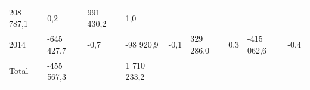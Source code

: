 \begin{longtable}[]{@{}lllllllll@{}}
\begin{minipage}[t]{0.12\columnwidth}
208 787,1\strut
\end{minipage} & \begin{minipage}[t]{0.06\columnwidth}\raggedright
0,2\strut
\end{minipage} & \begin{minipage}[t]{0.10\columnwidth}\raggedright
991 430,2\strut
\end{minipage} & \begin{minipage}[t]{0.06\columnwidth}\raggedright
1,0\strut
\end{minipage}\tabularnewline
\begin{minipage}[t]{0.05\columnwidth}\raggedright
2014\strut
\end{minipage} & \begin{minipage}[t]{0.10\columnwidth}\raggedright
-645 427,7\strut
\end{minipage} & \begin{minipage}[t]{0.06\columnwidth}\raggedright
-0,7\strut
\end{minipage} & \begin{minipage}[t]{0.16\columnwidth}\raggedright
-98 920,9\strut
\end{minipage} & \begin{minipage}[t]{0.06\columnwidth}\raggedright
-0,1\strut
\end{minipage} & \begin{minipage}[t]{0.12\columnwidth}\raggedright
329 286,0\strut
\end{minipage} & \begin{minipage}[t]{0.06\columnwidth}\raggedright
0,3\strut
\end{minipage} & \begin{minipage}[t]{0.10\columnwidth}\raggedright
-415 062,6\strut
\end{minipage} & \begin{minipage}[t]{0.06\columnwidth}\raggedright
-0,4\strut
\end{minipage}\tabularnewline
\begin{minipage}[t]{0.05\columnwidth}\raggedright
Total\strut
\end{minipage} & \begin{minipage}[t]{0.10\columnwidth}\raggedright
-455 567,3\strut
\end{minipage} & \begin{minipage}[t]{0.06\columnwidth}\raggedright
\strut
\end{minipage} & \begin{minipage}[t]{0.16\columnwidth}\raggedright
1 710 233,2\strut

\end{minipage}
\end{longtable}
